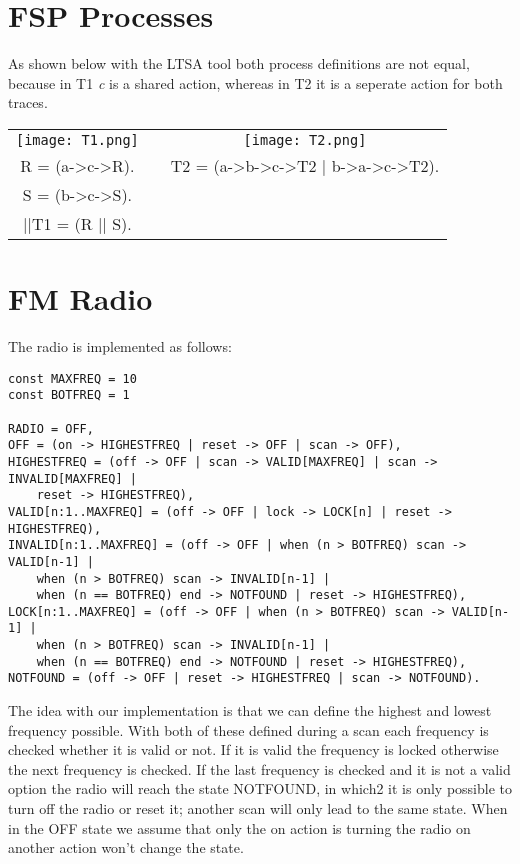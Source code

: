 \documentclass{report}
\begin{document}
	\section{FSP Processes}
	\startsection
		As shown below with the LTSA tool both process definitions are not equal, because in T1 \textit{c} is a shared action, whereas in T2 it is a seperate action for both traces. \\
		\begin{tabular}{ccc}
			\texttt{[image: T1.png]} && \texttt{[image: T2.png]} \\
			R = (a->c->R). && T2 = (a->b->c->T2 | b->a->c->T2). \\
			S = (b->c->S). \\
			||T1 = (R || S).
		\end{tabular}
	\closesection
	
	\newpage	
	
	\section{FM Radio}
	\startsection
		The radio is implemented as follows:
		\startsubsection
			\begin{verbatim}
const MAXFREQ = 10
const BOTFREQ = 1

RADIO = OFF,
OFF = (on -> HIGHESTFREQ | reset -> OFF | scan -> OFF),
HIGHESTFREQ = (off -> OFF | scan -> VALID[MAXFREQ] | scan -> INVALID[MAXFREQ] | 
	reset -> HIGHESTFREQ),
VALID[n:1..MAXFREQ] = (off -> OFF | lock -> LOCK[n] | reset -> HIGHESTFREQ),
INVALID[n:1..MAXFREQ] = (off -> OFF | when (n > BOTFREQ) scan -> VALID[n-1] | 
	when (n > BOTFREQ) scan -> INVALID[n-1] | 
	when (n == BOTFREQ) end -> NOTFOUND | reset -> HIGHESTFREQ),
LOCK[n:1..MAXFREQ] = (off -> OFF | when (n > BOTFREQ) scan -> VALID[n-1] | 
	when (n > BOTFREQ) scan -> INVALID[n-1] | 
	when (n == BOTFREQ) end -> NOTFOUND | reset -> HIGHESTFREQ),
NOTFOUND = (off -> OFF | reset -> HIGHESTFREQ | scan -> NOTFOUND).
			\end{verbatim}
		\closesection
		The idea with our implementation is that we can define the highest and lowest frequency possible. With both of these defined during a scan each frequency is checked whether it is valid or not. If it is valid the frequency is locked otherwise the next frequency is checked. If the last frequency is checked and it is not a valid option the radio will reach the state NOTFOUND, in which2 it is only possible to turn off the radio or reset it; another scan will only lead to the same state. When in the OFF state we assume that only the on action is turning the radio on another action won't change the state.
	\closesection
	
\end{document}
